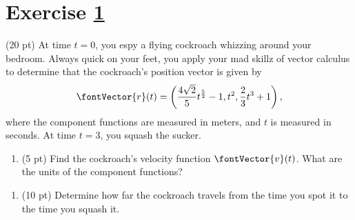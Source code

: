 %
%
%
%

\section{Exercise \ref{sec: Math212 2016 Fall HalfExam01Q03}}
\label{sec: Math212 2016 Fall HalfExam01Q03}

(20 pt) At time $t = 0$, you espy a flying cockroach whizzing around your bedroom. Always quick on your feet, you apply your mad skillz of vector calculus to determine that the cockroach's position vector is given by
\begin{align*}
\fontVector{r}(t)
=
\left(\frac{4 \sqrt{2}}{5} t^{\frac{5}{2}} - 1,t^{2},\frac{2}{3} t^{3} + 1\right),
\end{align*}
where the component functions are measured in meters, and $t$ is measured in seconds. At time $t = 3$, you squash the sucker.
\begin{enumerate}[label=(\alph*)]
\item\label{itm: Math212 2016 Fall HalfExam01Q03a} (5 pt) Find the cockroach's velocity function $\fontVector{v}(t)$. What are the units of the component functions?
\end{enumerate}






\begin{enumerate}[resume,label=(\alph*)]
\item\label{itm: Math212 2016 Fall HalfExam01Q03b} (10 pt) Determine how far the cockroach travels from the time you spot it to the time you squash it.
\end{enumerate}



